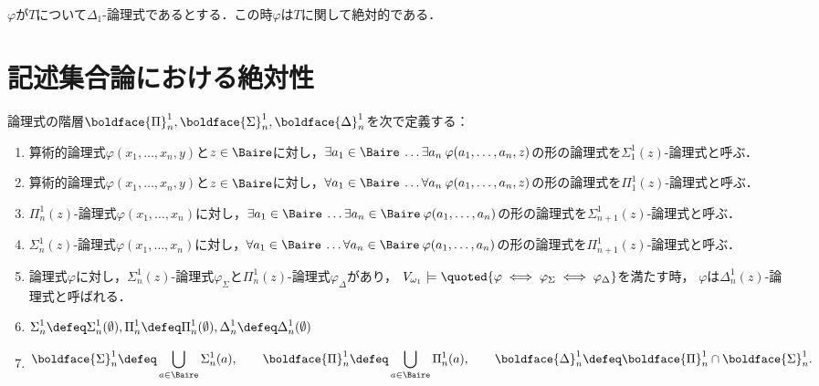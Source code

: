 \documentclass[a4j]{ltjsarticle}
\begin{document}
\begin{theorem}
 $\varphi$が$T$について$\Delta_1$-論理式であるとする．この時$\varphi$は$T$に関して絶対的である．
\end{theorem}

\section{記述集合論における絶対性}

\begin{definition}
 論理式の階層$\boldface{\Pi}^1_n, \boldface{\Sigma}^1_n, \boldface{\Delta}^1_n$を次で定義する：
 \begin{enumerate}
  \item 算術的論理式$\varphi(x_1, \dots, x_n, y)$と$z \in \Baire$に対し，$\exists a_1 \in \Baire\: \dots \exists a_n\: \varphi(a_1, \dots, a_n, z)$の形の論理式を$\Sigma^1_1(z)$-論理式と呼ぶ．
  \item 算術的論理式$\varphi(x_1, \dots, x_n, y)$と$z \in \Baire$に対し，$\forall a_1 \in \Baire\: \dots \forall a_n\: \varphi(a_1, \dots, a_n, z)$の形の論理式を$\Pi^1_1(z)$-論理式と呼ぶ．
  \item $\Pi^1_n(z)$-論理式$\varphi(x_1, \dots, x_n)$に対し，$\exists a_1 \in \Baire\:\dots \exists a_n \in \Baire\: \varphi(a_1, \dots, a_n)$の形の論理式を$\Sigma^1_{n+1}(z)$-論理式と呼ぶ．
  \item $\Sigma^1_n(z)$-論理式$\varphi(x_1, \dots, x_n)$に対し，$\forall a_1 \in \Baire\:\dots \forall a_n \in \Baire\: \varphi(a_1, \dots, a_n)$の形の論理式を$\Pi^1_{n+1}(z)$-論理式と呼ぶ．
  \item 論理式$\varphi$に対し，$\Sigma^1_n(z)$-論理式$\varphi_\Sigma$と$\Pi^1_n(z)$-論理式$\varphi_\Delta$があり，
        $V_{\omega_1} \models \quoted{\varphi \iff \varphi_\Sigma \iff \varphi_\Delta}$を満たす時，
        $\varphi$は$\Delta^1_n(z)$-論理式と呼ばれる．
  \item $\begin{gathered}
         \Sigma^1_n \defeq \Sigma^1_n(\emptyset), \Pi^1_n \defeq \Pi^1_n(\emptyset), \Delta^1_n \defeq \Delta^1_n(\emptyset)\end{gathered}$
  \item $\begin{gathered}\boldface{\Sigma}^1_n \defeq \bigcup_{a \in \Baire} \Sigma^1_n(a), \qquad
        \boldface{\Pi}^1_n \defeq \bigcup_{a \in \Baire} \Pi^1_n(a), \qquad
        \boldface{\Delta}^1_n \defeq \boldface{\Pi}^1_n \cap \boldface{\Sigma}^1_n.\end{gathered}$
 \end{enumerate}
\end{definition}
\end{document}
